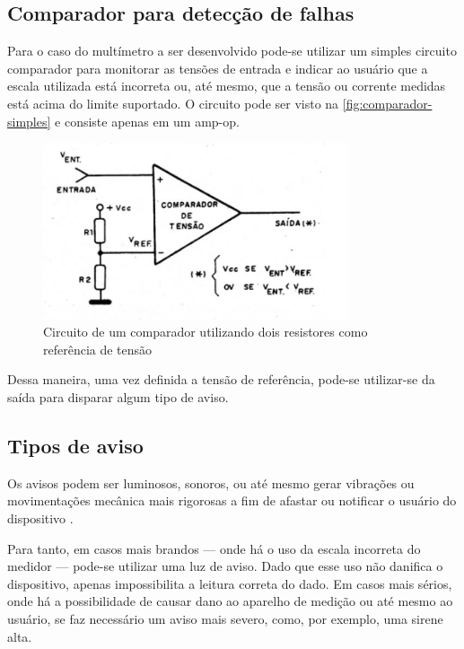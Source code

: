 \subsection{Comparador para detecção de falhas} \label{subsec:compfalhas}

Para o caso do multímetro a ser desenvolvido pode-se utilizar um simples circuito comparador para monitorar as tensões de entrada e indicar ao usuário que a escala utilizada está incorreta ou, até mesmo, que a tensão ou corrente medidas está acima do limite suportado. O circuito pode ser visto na \autoref{fig:comparador-simples} e consiste apenas em um \gls{amp-op}.

\begin{figure}[htb!]
    \caption{Circuito de um comparador utilizando dois resistores como referência de tensão}
    \label{fig:comparador-simples}
    \includegraphics[width=0.8\textwidth]{figuras/ampop-comparador.png}
\end{figure}

Dessa maneira, uma vez definida a tensão de referência, pode-se utilizar-se da saída para disparar algum tipo de aviso.

\subsection{Tipos de aviso} \label{subsec:tiposdeaviso}

Os avisos podem ser luminosos, sonoros, ou até mesmo gerar vibrações ou movimentações mecânica mais rigorosas a fim de afastar ou notificar o usuário do dispositivo \cite{base_alarms}.

Para tanto, em casos mais brandos --- onde há o uso da escala incorreta do medidor --- pode-se utilizar uma luz de aviso. Dado que esse uso não danifica o dispositivo, apenas impossibilita a leitura correta do dado.
Em casos mais sérios, onde há a possibilidade de causar dano ao aparelho de medição ou até mesmo ao usuário, se faz necessário um aviso mais severo, como, por exemplo, uma sirene alta.

